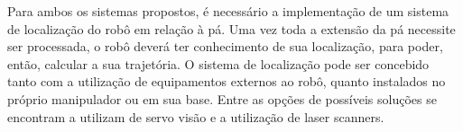 Para ambos os sistemas propostos, é necessário a implementação de um sistema de
localização do robô em relação à pá. Uma vez toda a extensão da pá necessite ser
processada, o robô deverá ter conhecimento de sua localização, para poder,
então, calcular a sua trajetória. O sistema de localização pode ser concebido
tanto com a utilização de equipamentos externos ao robô, quanto instalados no
próprio manipulador ou em sua base. Entre as opções de possíveis soluções se
encontram a utilizam de servo visão e a utilização de laser scanners.

